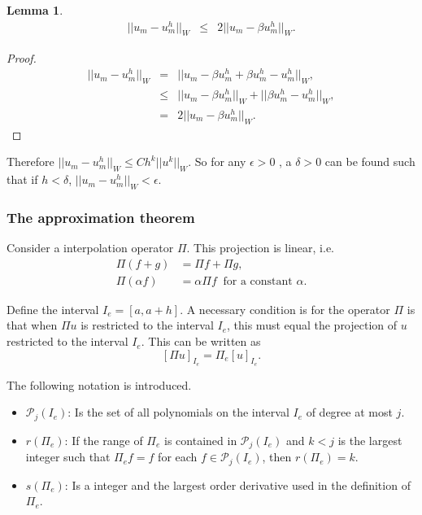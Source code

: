 \documentclass[../../main.tex]{subfiles}
\begin{document}
\newtheorem{Lem_9}[Lem_1]{Lemma} 
\begin{Lem_9}
	\label{Lem_9}
	\begin{eqnarray*}
		||u_{m} -  u_{m}^{h}||_{W} &\leq & 2||u_{m}-\beta u^{h}_{m}||_{W}.
	\end{eqnarray*}
\end{Lem_9}
\begin{proof}
	\begin{eqnarray*}
	||u_{m} - u_{m}^{h}||_{W} &=& ||u_{m} - \beta u_{m}^{h} + \beta u_{m}^{h} - u_{m}^{h}||_{W}, \\
						& \leq & ||u_{m} - \beta u_{m}^{h}||_{W} + ||\beta u_{m}^{h} - u_{m}^{h}||_{W}, \\
						& = & 2||u_{m} - \beta u_{m}^{h}||_{W}.	
	\end{eqnarray*}
\end{proof}

Therefore $||u_{m} -  u_{m}^{h}||_{W} \leq Ch^{k}||u^{k}||_{W}$. So for any $\epsilon >0$ , a $\delta >0$ can be found such that if $h < \delta$, $||u_{m} -  u_{m}^{h}||_{W} < \epsilon$.


\subsubsection{The approximation theorem}

Consider a interpolation operator $\Pi$.\label{sym:interpolation} This projection is linear, i.e.
\begin{align*}
	\Pi(f + g) & = \Pi f + \Pi g,\\
	\Pi(\alpha f) & = \alpha \Pi f \ \text{ for a constant } \alpha. 
\end{align*}

Define the interval $I_e = [a, a+h]$. A necessary condition is for the operator $\Pi$ is that when $\Pi u$ is restricted to the interval $I_e$, this must equal the projection of $u$ restricted to the interval $I_e$. This can be written as
\begin{equation*}
	\left[ \Pi u \right]_{I_{e}} = \Pi_e [u]_{I_{e}}.
\end{equation*}

The following notation is introduced.
\begin{itemize}
	\item[] $\mathcal{P}_j(I_e)$: Is the set of all polynomials on the interval $I_e$ of degree at most $j$. \label{sym:poly}
	\item[] $r(\Pi_e)$: If the range of $\Pi_e$ is contained in $\mathcal{P}_j(I_e)$ and $k<j$ is the largest integer such that $\Pi_e f = f$ for each $f \in \mathcal{P}_j(I_e)$, then $r(\Pi_e) = k$.
	\item[] $s(\Pi_e)$: Is a integer and the largest order derivative used in the definition of $\Pi_e$.
\end{itemize}
\end{document}
